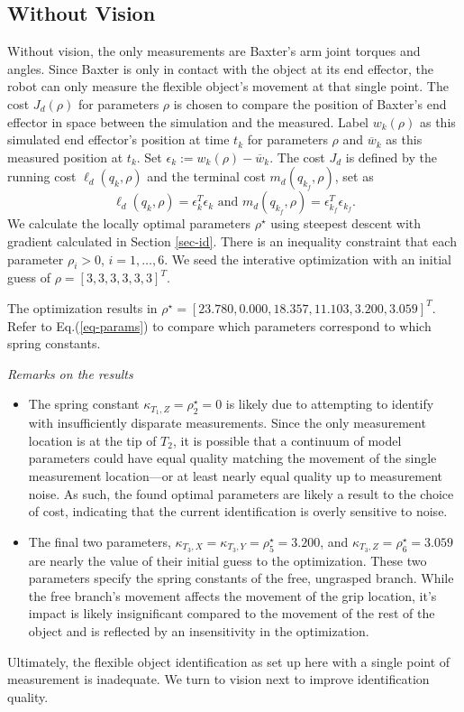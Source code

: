 \documentclass[runningheads,a4paper]{llncs}
\begin{document}
\subsection{Without Vision \label{sec-no_vis}}
Without vision, the only measurements are Baxter's arm joint torques and angles.  Since Baxter is only in contact with the object at its end effector, the robot can only measure the flexible object's movement at that single point. The cost $J_d(\rho)$ for parameters $\rho$ is chosen to compare the position of Baxter's end effector in space between the simulation and the measured.  Label $w_k(\rho)$ as this simulated end effector's position at time $t_k$ for parameters $\rho$ and $\overline{w}_k$ as this measured position at $t_k$.  Set $\epsilon_k := w_k(\rho)-\overline{w}_k$.  The cost $J_d$ is defined by the running cost $\ell_d(q_k,\rho)$ and the terminal cost $m_d(q_{k_f},\rho)$, set as
\[
\ell_d(q_k,\rho) = \epsilon_k^T\epsilon_k \textrm{ and } m_d(q_{k_f},\rho) = \epsilon_{k_f}^T\epsilon_{k_f}.
\]
We calculate the locally optimal parameters $\rho^\star$ using steepest descent with gradient calculated in Section \ref{sec-id}. There is an inequality constraint that each parameter $\rho_i>0$, $i = 1,\ldots,6$. We seed the interative optimization with an initial guess of $\rho = [3, 3, 3, 3, 3, 3]^T$.  %

The optimization results in $\rho^\star = [23.780,  0.000 , 18.357 , 11.103 , 3.200,  3.059]^T$. Refer to Eq.(\ref{eq-params}) to compare which parameters correspond to which spring constants. 

\emph{Remarks on the results}
\begin{itemize}
\item The spring constant $\kappa_{T_1,Z} = \rho^\star_2 = 0$ is likely due to attempting to identify with insufficiently disparate measurements. Since the only measurement location is at the tip of $T_2$, it is possible that a continuum of model parameters could have equal quality matching the movement of the single measurement location---or at least nearly equal quality up to measurement noise. As such, the found optimal parameters are likely a result to the choice of cost, indicating that the current identification is overly sensitive to noise.
\item The final two parameters, $\kappa_{T_3,X} = \kappa_{T_3,Y} = \rho^\star_5 = 3.200$, and $\kappa_{T_3,Z} = \rho^\star_6 = 3.059$ are nearly the value of their initial guess to the optimization. These two parameters specify the spring constants of the free, ungrasped branch. While the free branch's movement affects the movement of the grip location, it's impact is likely insignificant compared to the movement of the rest of the object and is reflected by an insensitivity in the optimization.
\end{itemize}
Ultimately, the flexible object identification as set up here with a single point of measurement is inadequate. We turn to vision next to improve identification quality.
\end{document}

